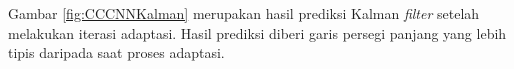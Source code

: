 \noindent Gambar \ref{fig:CCCNNKalman} merupakan hasil prediksi Kalman \textit{filter} setelah melakukan iterasi adaptasi. Hasil prediksi diberi garis persegi panjang yang lebih tipis daripada saat proses adaptasi.

\begin{adjustbox}{width=1\textwidth}
\noindent\begin{minipage}{\linewidth}
	\label{fig:CCCNNKalman}
\end{minipage}
\end{adjustbox}

